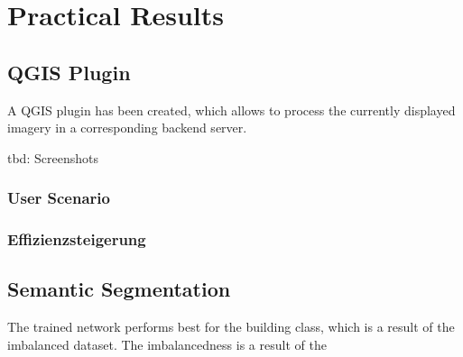 
\chapter{Practical Results}\label{chp:practical_results}

\section{QGIS Plugin}
A QGIS plugin has been created, which allows to process the currently displayed imagery in a corresponding backend server.

tbd: Screenshots

\subsection{User Scenario}

\subsection{Effizienzsteigerung}

\section{Semantic Segmentation}
The trained network performs best for the building class, which is a result of the imbalanced dataset. The imbalancedness is a result of the 